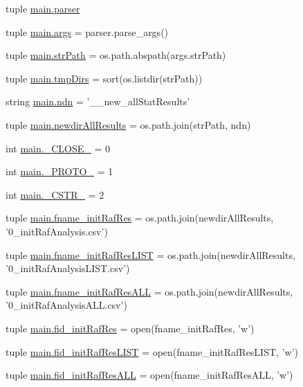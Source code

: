 \begin{DoxyCompactItemize}
\item 
tuple \hyperlink{a00122_a6596d20927a9196bbb33aef704e88297}{main.\-parser}
\item 
tuple \hyperlink{a00122_a80760a53c8941c6f6f30e633649ffd8d}{main.\-args} = parser.\-parse\-\_\-args()
\item 
tuple \hyperlink{a00122_ac0b5b603b5f89c10838ce6a42be8c6f7}{main.\-str\-Path} = os.\-path.\-abspath(args.\-str\-Path)
\item 
tuple \hyperlink{a00122_a9606754176252315321d1faa6191479e}{main.\-tmp\-Dirs} = sort(os.\-listdir(str\-Path))
\item 
string \hyperlink{a00122_acaa3f6fffb18a543c7c04d985e77fa6f}{main.\-ndn} = '\-\_\-\_\-new\-\_\-all\-Stat\-Results'
\item 
tuple \hyperlink{a00122_af73b43f5468097ae9443adeb6010a75c}{main.\-newdir\-All\-Results} = os.\-path.\-join(str\-Path, ndn)
\item 
int \hyperlink{a00122_a05832bb8aa5b5b63ca022653c9b32af5}{main.\-\_\-\-C\-L\-O\-S\-E\-\_\-} = 0
\item 
int \hyperlink{a00122_afe92b072adc360963093d3660e7684ce}{main.\-\_\-\-P\-R\-O\-T\-O\-\_\-} = 1
\item 
int \hyperlink{a00122_a4994448f45a50087ae8864153ab89e10}{main.\-\_\-\-C\-S\-T\-R\-\_\-} = 2
\item 
tuple \hyperlink{a00122_a72ed3f9434cc4dcc2240c6ca408960ff}{main.\-fname\-\_\-init\-Raf\-Res} = os.\-path.\-join(newdir\-All\-Results, '0\-\_\-init\-Raf\-Analysis.\-csv')
\item 
tuple \hyperlink{a00122_adf05ced8171427a0ea7daf7e595f72b6}{main.\-fname\-\_\-init\-Raf\-Res\-L\-I\-S\-T} = os.\-path.\-join(newdir\-All\-Results, '0\-\_\-init\-Raf\-Analysis\-L\-I\-S\-T.\-csv')
\item 
tuple \hyperlink{a00122_a1b43b3b737d94a412b2334b78252cdef}{main.\-fname\-\_\-init\-Raf\-Res\-A\-L\-L} = os.\-path.\-join(newdir\-All\-Results, '0\-\_\-init\-Raf\-Analysis\-A\-L\-L.\-csv')
\item 
tuple \hyperlink{a00122_a98d514a663f6bedde329d0bbbd2b78fa}{main.\-fid\-\_\-init\-Raf\-Res} = open(fname\-\_\-init\-Raf\-Res, 'w')
\item 
tuple \hyperlink{a00122_ae24c607a37f0f3f23d7e87f6bb4fe45b}{main.\-fid\-\_\-init\-Raf\-Res\-L\-I\-S\-T} = open(fname\-\_\-init\-Raf\-Res\-L\-I\-S\-T, 'w')
\item 
tuple \hyperlink{a00122_a45aeb03f0d9cc30cb0a490354fd76d6c}{main.\-fid\-\_\-init\-Raf\-Res\-A\-L\-L} = open(fname\-\_\-init\-Raf\-Res\-A\-L\-L, 'w')

\end{DoxyCompactItemize}
